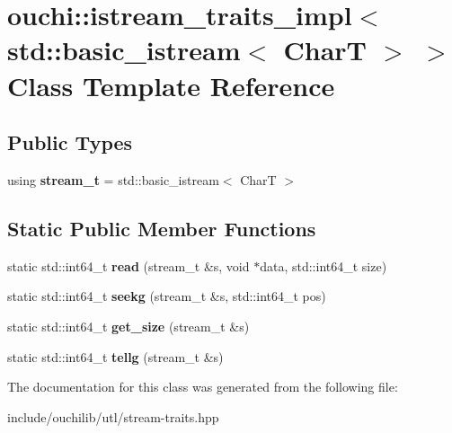 \hypertarget{classouchi_1_1istream__traits__impl_3_01std_1_1basic__istream_3_01_char_t_01_4_01_4}{}\section{ouchi\+::istream\+\_\+traits\+\_\+impl$<$ std\+::basic\+\_\+istream$<$ CharT $>$ $>$ Class Template Reference}
\label{classouchi_1_1istream__traits__impl_3_01std_1_1basic__istream_3_01_char_t_01_4_01_4}
\subsection*{Public Types}
\begin{DoxyCompactItemize}
\item 
\mbox{\label{classouchi_1_1istream__traits__impl_3_01std_1_1basic__istream_3_01_char_t_01_4_01_4_a9600c4201f1336028e19564f8e18f74d}} 
using {\bfseries stream\+\_\+t} = std\+::basic\+\_\+istream$<$ CharT $>$
\end{DoxyCompactItemize}
\subsection*{Static Public Member Functions}
\begin{DoxyCompactItemize}
\item 
\mbox{\label{classouchi_1_1istream__traits__impl_3_01std_1_1basic__istream_3_01_char_t_01_4_01_4_a7dc758e2b6fca8e4acb31dc4506c8ab1}} 
static std\+::int64\+\_\+t {\bfseries read} (stream\+\_\+t \&s, void $\ast$data, std\+::int64\+\_\+t size)
\item 
\mbox{\label{classouchi_1_1istream__traits__impl_3_01std_1_1basic__istream_3_01_char_t_01_4_01_4_a095bf31fc4fc1775fc1ae6c17da737ee}} 
static std\+::int64\+\_\+t {\bfseries seekg} (stream\+\_\+t \&s, std\+::int64\+\_\+t pos)
\item 
\mbox{\label{classouchi_1_1istream__traits__impl_3_01std_1_1basic__istream_3_01_char_t_01_4_01_4_a06d3fe28bbeae93d6e30c5bc8052a9f7}} 
static std\+::int64\+\_\+t {\bfseries get\+\_\+size} (stream\+\_\+t \&s)
\item 
\mbox{\label{classouchi_1_1istream__traits__impl_3_01std_1_1basic__istream_3_01_char_t_01_4_01_4_aeabef724dcc5aedcaf6279631a64e7ef}} 
static std\+::int64\+\_\+t {\bfseries tellg} (stream\+\_\+t \&s)
\end{DoxyCompactItemize}


The documentation for this class was generated from the following file\+:\begin{DoxyCompactItemize}
\item 
include/ouchilib/utl/stream-\/traits.\+hpp\end{DoxyCompactItemize}
